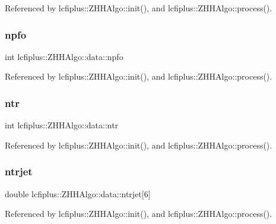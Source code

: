 Referenced by lcfiplus\+::\+Z\+H\+H\+Algo\+::init(), and lcfiplus\+::\+Z\+H\+H\+Algo\+::process().

\mbox{\label{structlcfiplus_1_1ZHHAlgo_1_1data_afbd9259689ef8fe94c197e7ad1ab7843}} 
\subsubsection{npfo}
{\footnotesize\ttfamily int lcfiplus\+::\+Z\+H\+H\+Algo\+::data\+::npfo}



Referenced by lcfiplus\+::\+Z\+H\+H\+Algo\+::init(), and lcfiplus\+::\+Z\+H\+H\+Algo\+::process().

\mbox{\label{structlcfiplus_1_1ZHHAlgo_1_1data_a477334dcff374295f6f4f1af7d3ad029}} 
\subsubsection{ntr}
{\footnotesize\ttfamily int lcfiplus\+::\+Z\+H\+H\+Algo\+::data\+::ntr}



Referenced by lcfiplus\+::\+Z\+H\+H\+Algo\+::init(), and lcfiplus\+::\+Z\+H\+H\+Algo\+::process().

\mbox{\label{structlcfiplus_1_1ZHHAlgo_1_1data_a1ba9078829d21d6a46aa12e09845c6e3}} 
\subsubsection{ntrjet}
{\footnotesize\ttfamily double lcfiplus\+::\+Z\+H\+H\+Algo\+::data\+::ntrjet[6]}



Referenced by lcfiplus\+::\+Z\+H\+H\+Algo\+::init(), and lcfiplus\+::\+Z\+H\+H\+Algo\+::process().

\mbox{\label{structlcfiplus_1_1ZHHAlgo_1_1data_a4608ac72390aee159dc01477018310ac}} 
